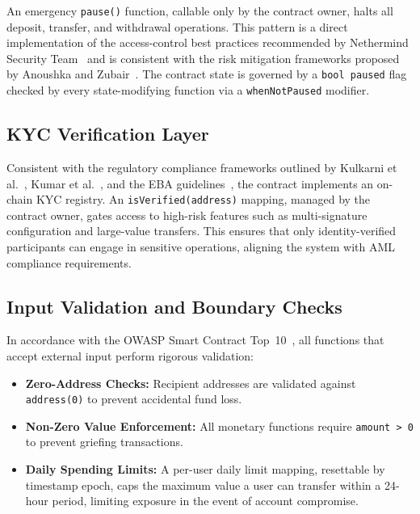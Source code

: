 \documentclass[conference]{IEEEtran}
\begin{document}
An emergency \texttt{pause()} function, callable only by the contract owner,
halts all deposit, transfer, and withdrawal operations. This pattern is a
direct implementation of the access-control best practices recommended by
Nethermind Security Team~\cite{ref9} and is consistent with the risk mitigation
frameworks proposed by Anoushka and Zubair~\cite{ref3}. The contract state is
governed by a \texttt{bool paused} flag checked by every state-modifying
function via a \texttt{whenNotPaused} modifier.

\subsection{KYC Verification Layer}

Consistent with the regulatory compliance frameworks outlined by Kulkarni
et al.~\cite{ref20}, Kumar et al.~\cite{ref21}, and the EBA
guidelines~\cite{ref5}, the contract implements an on-chain KYC registry. An
\texttt{isVerified(address)} mapping, managed by the contract owner, gates
access to high-risk features such as multi-signature configuration and
large-value transfers. This ensures that only identity-verified participants
can engage in sensitive operations, aligning the system with AML compliance
requirements.

\subsection{Input Validation and Boundary Checks}

In accordance with the OWASP Smart Contract Top~10~\cite{ref11}, all functions
that accept external input perform rigorous validation:

\begin{itemize}
  \item \textbf{Zero-Address Checks:} Recipient addresses are validated against
    \texttt{address(0)} to prevent accidental fund loss.
  \item \textbf{Non-Zero Value Enforcement:} All monetary functions require
    \texttt{amount > 0} to prevent griefing transactions.
  \item \textbf{Daily Spending Limits:} A per-user daily limit mapping,
    resettable by timestamp epoch, caps the maximum value a user can transfer
    within a 24-hour period, limiting exposure in the event of account
    compromise.
\end{itemize}

\end{document}
